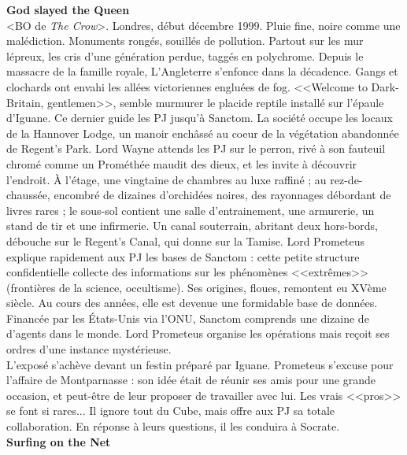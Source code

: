 \documentclass[11pt,twoside,a4paper]{book}
\begin{document}
\textbf{\large God slayed the Queen}~\\

<BO de \emph{The Crow}>. Londres, d{\'e}but d{\'e}cembre 1999. Pluie fine, noire comme une mal{\'e}diction. Monuments rong{\'e}s, souill{\'e}s de pollution. Partout sur les mur l{\'e}preux, les cris d'une g{\'e}n{\'e}ration perdue, tagg{\'e}s en polychrome. Depuis le massacre de la famille royale, L'Angleterre s'enfonce dans la d{\'e}cadence. Gangs et clochards ont envahi les all{\'e}es victoriennes englu{\'e}es de fog. <<Welcome to Dark-Britain, gentlemen>>, semble murmurer le placide reptile install{\'e} sur l'{\'e}paule d'Iguane. Ce dernier guide les PJ jusqu'{\`a} Sanctom. La soci{\'e}t{\'e} occupe les locaux de la Hannover Lodge, un manoir ench{\^a}ss{\'e} au coeur de la v{\'e}g{\'e}tation abandonn{\'e}e de Regent's Park. Lord Wayne attends les PJ sur le perron, riv{\'e} {\`a} son fauteuil chrom{\'e} comme un Prom{\'e}th{\'e}e maudit des dieux, et les invite {\`a} d{\'e}couvrir l'endroit. {\`A} l'{\'e}tage, une vingtaine de chambres au luxe raffin{\'e} ; au rez-de-chauss{\'e}e, encombr{\'e} de dizaines d'orchid{\'e}es noires, des rayonnages d{\'e}bordant de livres rares ; le sous-sol contient une salle d'entrainement, une armurerie, un stand de tir et une infirmerie. Un canal souterrain, abritant deux hors-bords, d{\'e}bouche sur le Regent's Canal, qui donne sur la Tamise. Lord Prometeus explique rapidement aux PJ les bases de Sanctom : cette petite structure confidentielle collecte des informations sur les ph{\'e}nom{\`e}nes <<extr{\^e}mes>> (fronti{\`e}res de la science, occultisme). Ses origines, floues, remontent eu XV{\`e}me si{\`e}cle. Au cours des ann{\'e}es, elle est devenue une formidable base de donn{\'e}es. Financ{\'e}e par les {\'E}tats-Unis via l'ONU, Sanctom comprends une dizaine de d'agents dans le monde. Lord Prometeus organise les op{\'e}rations mais re\c{c}oit ses ordres d'une instance myst{\'e}rieuse.~\\

L'expos{\'e} s'ach{\`e}ve devant un festin pr{\'e}par{\'e} par Iguane. Prometeus s'excuse pour l'affaire de Montparnasse : son id{\'e}e {\'e}tait de r{\'e}unir ses amis pour une grande occasion, et peut-{\^e}tre de leur proposer de travailler avec lui. Les vrais <<pros>> se font si rares... Il ignore tout du Cube, mais offre aux PJ sa totale collaboration. En r{\'e}ponse {\`a} leurs questions, il les conduira {\`a} Socrate.~\\

\textbf{\large Surfing on the Net}~\\
\end{document}
